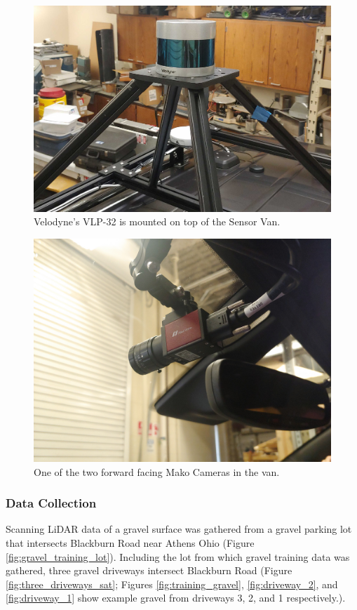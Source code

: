 \documentclass[numbered,pdftex]{ohio-etd}
\begin{document}
{{{{				\begin{figure}[H]
					\centering
					\includegraphics[width=0.7\linewidth]{Defense_Images/vlp_32_mount_2}
					\caption[VLP 32 on Van]{Velodyne's VLP-32 is mounted on top of the Sensor Van.}
					\label{fig:vlp32mount}
				\end{figure}
				
				\begin{figure}[H]
					\centering
					\includegraphics[width=0.7\linewidth]{Defense_Images/Mako_Camera}
					\caption[Mako Camera]{One of the two forward facing Mako Cameras in the van.}
					\label{fig:makocamera}
				\end{figure}
			
			} %
			
			\subsubsection{Data Collection}{
				
				{Scanning LiDAR data of a gravel surface was gathered from a gravel parking lot that intersects Blackburn Road near Athens Ohio (Figure \ref{fig:gravel_training_lot}). Including the lot from which gravel training data was gathered, three gravel driveways intersect Blackburn Road (Figure \ref{fig:three_driveways_sat}; Figures \ref{fig:training_gravel}, \ref{fig:driveway_2}, and \ref{fig:driveway_1} show example gravel from driveways 3, 2, and 1 respectively.). 
					
}}}}}
\end{document}
